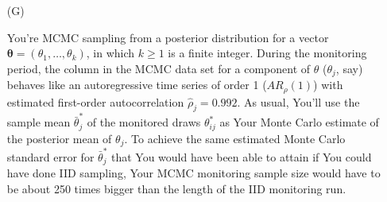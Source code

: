 \documentclass[12pt]{article}
\begin{document}
\begin{itemize}
\item[(G)]

You're MCMC sampling from a posterior distribution for a vector $\bm{ \theta } = ( \theta_1, \dots, \theta_k )$, in which $k \ge 1$ is a finite integer. During the monitoring period, the column in the MCMC data set for a component of $\theta$ ($\theta_j$, say) behaves like an autoregressive time series of order 1 ($AR_\rho ( 1 )$) with estimated first-order autocorrelation $\hat{ \rho }_j = 0.992$. As usual, You'll use the sample mean $\bar{ \theta }_j^*$ of the monitored draws $\theta_{ ij }^*$ as Your Monte Carlo estimate of the posterior mean of $\theta_j$. To achieve the same estimated Monte Carlo standard error for $\bar{ \theta }_j^*$ that You would have been able to attain if You could have done IID sampling, Your MCMC monitoring sample size would have to be about 250 times bigger than the length of the IID monitoring run.

\end{itemize}
\end{document}
